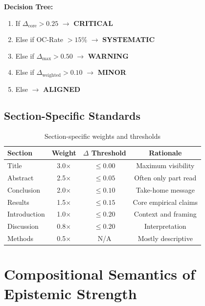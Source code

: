 \textbf{Decision Tree:}
\begin{enumerate}
    \item If $\Delta_{\text{core}} > 0.25$ $\rightarrow$ \textbf{CRITICAL}
    \item Else if OC-Rate $> 15\%$ $\rightarrow$ \textbf{SYSTEMATIC}
    \item Else if $\Delta_{\text{max}} > 0.50$ $\rightarrow$ \textbf{WARNING}
    \item Else if $\Delta_{\text{weighted}} > 0.10$ $\rightarrow$ \textbf{MINOR}
    \item Else $\rightarrow$ \textbf{ALIGNED}
\end{enumerate}


\subsection{Section-Specific Standards}

\begin{table}[H]
\centering
\caption{Section-specific weights and thresholds}
\begin{tabular}{lccc}
\toprule
\textbf{Section} & \textbf{Weight} & \textbf{$\Delta$ Threshold} & \textbf{Rationale} \\
\midrule
Title & 3.0$\times$ & $\leq 0.00$ & Maximum visibility \\
Abstract & 2.5$\times$ & $\leq 0.05$ & Often only part read \\
Conclusion & 2.0$\times$ & $\leq 0.10$ & Take-home message \\
Results & 1.5$\times$ & $\leq 0.15$ & Core empirical claims \\
Introduction & 1.0$\times$ & $\leq 0.20$ & Context and framing \\
Discussion & 0.8$\times$ & $\leq 0.20$ & Interpretation \\
Methods & 0.5$\times$ & N/A & Mostly descriptive \\
\bottomrule
\end{tabular}
\end{table}



\section{Compositional Semantics of Epistemic Strength}
\label{sec:compositional}

